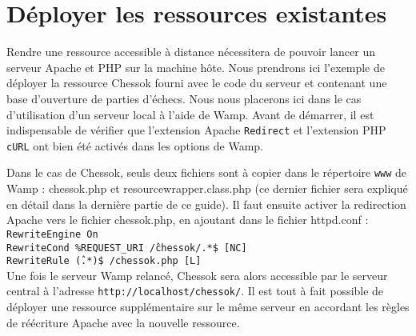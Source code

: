 \documentclass[a4paper,11pt]{report}
\begin{document}
\section{Déployer les ressources existantes}
		Rendre une ressource accessible à distance nécessitera de pouvoir lancer un serveur Apache et PHP sur la machine hôte. Nous prendrons ici l'exemple de déployer la ressource Chessok fourni avec le code du serveur et contenant une base d'ouverture de parties d'échecs. Nous nous placerons ici dans le cas d'utilisation d'un serveur local à l'aide de Wamp. Avant de démarrer, il est indispensable de vérifier que l'extension Apache {\tt Redirect} et l'extension PHP {\tt cURL} ont bien été activés dans les options de Wamp.
		
		Dans le cas de Chessok, seuls deux fichiers sont à copier dans le répertoire {\tt www} de Wamp : chessok.php et resourcewrapper.class.php (ce dernier fichier sera expliqué en détail dans la dernière partie de ce guide). Il faut ensuite activer la redirection Apache vers le fichier chessok.php, en ajoutant dans le fichier httpd.conf :
\\{\tt	RewriteEngine On\\
RewriteCond \%{REQUEST\_URI} \^/chessok/.*\$ [NC]\\
RewriteRule \^(.*)\$ /chessok.php [L] }\\
		Une fois le serveur Wamp relancé, Chessok sera alors accessible par le serveur central à l'adresse {\tt http://localhost/chessok/}. Il est tout à fait possible de déployer une ressource supplémentaire sur le même serveur en accordant les règles de réécriture Apache avec la nouvelle ressource.
		
\end{document}
